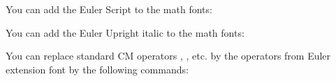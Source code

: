 You can add the Euler Script to the math fonts:

\addcmd{}
\def\script#1{{\fam\scriptfam#1}}
 
You can add the Euler Upright italic to the math fonts:

\addcmd{}
\def\upright#1{{\fam\upitfam#1}}

You can replace standard CM operators \sum, \int, etc. by the
operators from Euler extension font by the following commands:

\addcmd\mathfonts{\newmathfam\euexfam \loadmathfam\euexfam [/euex]}
\addcmd{}








